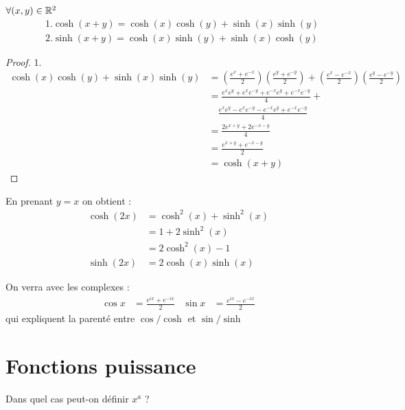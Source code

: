 \begin{graybox}
	\begin{proposition}[]
		$\forall (x, y) \in \mathbb{R}^2$
		\begin{align*}
			&1.\cosh{(x + y)} = \cosh{(x)}\cosh{(y)} + \sinh{(x)}\sinh{(y)} \\
			&2.\sinh{(x + y)} = \cosh{(x)}\sinh{(y)} + \sinh{(x)}\cosh{(y)}
		\end{align*}
	\end{proposition}
\end{graybox}

\begin{proof}
	1. 
	\begin{align*}
		\cosh{(x)}\cosh{(y)} + \sinh{(x)}\sinh{(y)} &= \left( \frac{e^x + e^{-x}}{2} \right) \left( \frac{e^y + e^{-y}}{2} \right) + \left( \frac{e^x - e^{-x}}{2} \right) \left( \frac{e^y - e^{-y}}{2} \right)\\
		&= \frac{e^x e^y + e^x e^{-y} + e^{-x}e^y + e^{-x} e^{-y}}{4} + \\ &\quad \frac{e^x e^y - e^x e^{-y} - e^{-x}e^y + e^{-x}e^{-y}}{4} \\
		&= \frac{2e^{x+y} + 2e^{-x-y}}{4} \\
		&= \frac{e^{x+y} + e^{-x-y}}{2} \\
		&= \cosh{(x + y)}
	\end{align*}
\end{proof}

\begin{remarque}
	En prenant $y = x$ on obtient :
	\begin{align*}
		\cosh{(2x)} &= \cosh^2{(x)} + \sinh^2{(x)} \\
		&= 1 + 2 \sinh^2{(x)} \\
		&= 2\cosh^2{(x)} - 1 \\
		\sinh{(2x)} &= 2\cosh{(x)} \sinh{(x)}
	\end{align*}
\end{remarque}


\begin{remarque}
	On verra avec les complexes :
	\begin{align*}
		\cos{x} &= \frac{e^{ix} + e^{-ix}}{2} & \sin{x} &= \frac{e^{ix} - e^{-ix}}{2}
	\end{align*}
	qui expliquent la parenté entre $\cos / \cosh$ et $\sin / \sinh$
\end{remarque}

\section{Fonctions puissance}
\par Dans quel cas peut-on définir $x^a$ ?

